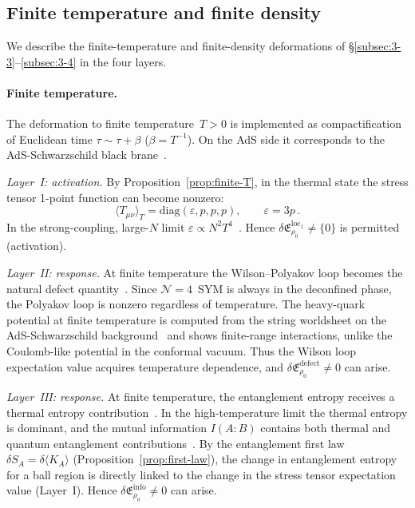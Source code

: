 \documentclass[
  aps,
  prd,
  preprint,
  groupedaddress,
  nofootinbib,
  longbibliography
]{revtex4-2}
\theoremstyle{remark}
\newcommand{\N}{\mathcal{N}}
\begin{document}
\subsection{Finite temperature and finite density}%
  \label{subsec:7-3}

We describe the finite-temperature and finite-density
deformations of \S\ref{subsec:3-3}--\ref{subsec:3-4}
in the four layers.

\paragraph{Finite temperature.}
The deformation to finite temperature~$T>0$ is implemented as
compactification of Euclidean time
$\tau\sim\tau+\beta$ ($\beta=T^{-1}$).
On the AdS side it corresponds to the AdS-Schwarzschild black
brane~\cite{ref39}.

\emph{Layer~I: activation.}
By Proposition~\ref{prop:finite-T}, in the thermal state the
stress tensor 1-point function can become nonzero:
\begin{equation}\label{eq:thermal-Tmunu-finiteT}
  \langle T_{\mu\nu}\rangle_T
  = \mathrm{diag}(\varepsilon,p,p,p),\qquad
  \varepsilon = 3p\,.
\end{equation}
In the strong-coupling, large-$N$ limit
$\varepsilon\propto N^2 T^4$~\cite{ref4,ref39}.
Hence
$\delta\mathfrak{E}_{\rho_0}^{\mathrm{loc}_1}\neq\{0\}$
is permitted (activation).

\emph{Layer~II: response.}
At finite temperature the Wilson--Polyakov loop becomes the
natural defect quantity~\cite{ref40}.
Since $\N=4$~SYM is always in the deconfined phase, the
Polyakov loop is nonzero regardless of temperature.
The heavy-quark potential at finite temperature is computed from
the string worldsheet on the AdS-Schwarzschild
background~\cite{ref40,ref46} and shows finite-range
interactions, unlike the Coulomb-like potential in the conformal
vacuum.
Thus the Wilson loop expectation value acquires temperature
dependence, and
$\delta\mathfrak{E}_{\rho_0}^{\mathrm{defect}}\neq 0$
can arise.

\emph{Layer~III: response.}
At finite temperature, the entanglement entropy receives a
thermal entropy contribution~\cite{ref42}.
In the high-temperature limit the thermal entropy is dominant,
and the mutual information $I(A:B)$ contains both thermal and
quantum entanglement contributions~\cite{ref42}.
By the entanglement first law
$\delta S_A=\delta\langle K_A\rangle$
(Proposition~\ref{prop:first-law}), the change in entanglement
entropy for a ball region is directly linked to the change in the
stress tensor expectation value (Layer~I).
Hence
$\delta\mathfrak{E}_{\rho_0}^{\mathrm{info}}\neq 0$
can arise.
\end{document}
